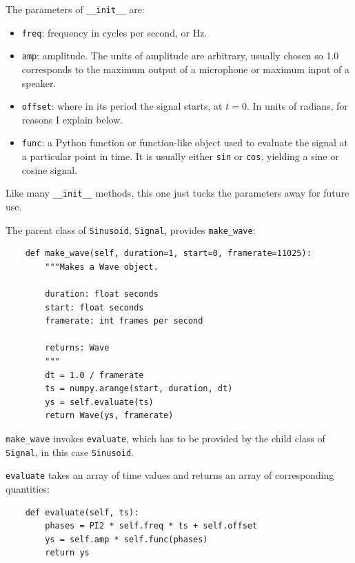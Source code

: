 \documentclass[12pt]{book}
\begin{document}
The parameters of \verb"__init__" are:

\begin{itemize}

\item {\tt freq}: frequency in cycles per second, or Hz.

\item {\tt amp}: amplitude.  The units of amplitude are arbitrary,
usually chosen so 1.0 corresponds to the maximum output of a
microphone or maximum input of a speaker.

\item {\tt offset}: where in its period the signal starts, at $t=0$.
In units of radians, for reasons I explain below.

\item {\tt func}: a Python function or function-like object used
to evaluate the signal at a particular point in time.  It is
usually either {\tt sin} or {\tt cos}, yielding a sine or
cosine signal.

\end{itemize}

Like many \verb"__init__" methods, this one just tucks the
parameters away for future use.

The parent class of {\tt Sinusoid}, {\tt Signal}, provides \verb"make_wave":

\begin{verbatim}
    def make_wave(self, duration=1, start=0, framerate=11025):
        """Makes a Wave object.

        duration: float seconds
        start: float seconds
        framerate: int frames per second

        returns: Wave
        """
        dt = 1.0 / framerate
        ts = numpy.arange(start, duration, dt)
        ys = self.evaluate(ts)
        return Wave(ys, framerate)
\end{verbatim}

\verb"make_wave" invokes {\tt evaluate}, which has to be provided
by the child class of {\tt Signal}, in this case {\tt Sinusoid}.

{\tt evaluate} takes an array of time values and returns an array of
corresponding quantities:

\begin{verbatim}
    def evaluate(self, ts):
        phases = PI2 * self.freq * ts + self.offset
        ys = self.amp * self.func(phases)
        return ys
\end{verbatim}
\end{document}
